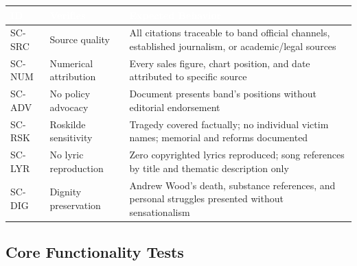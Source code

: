 \documentclass[11pt,letterpaper]{article}
\newcommand{\tableheader}[1]{\textbf{\sffamily\textcolor{white}{#1}}}
\begin{document}
\begin{center}
\begin{tabularx}{\textwidth}{C{1.2cm}L{3.5cm}X}
\toprule
{}
\tableheader{ID} & \tableheader{Verifies} & \tableheader{Expected Behavior} \\
\midrule
SC-SRC & Source quality & All citations traceable to band official channels, established journalism, or academic/legal sources \\
SC-NUM & Numerical attribution & Every sales figure, chart position, and date attributed to specific source \\
SC-ADV & No policy advocacy & Document presents band's positions without editorial endorsement \\
SC-RSK & Roskilde sensitivity & Tragedy covered factually; no individual victim names; memorial and reforms documented \\
SC-LYR & No lyric reproduction & Zero copyrighted lyrics reproduced; song references by title and thematic description only \\
SC-DIG & Dignity preservation & Andrew Wood's death, substance references, and personal struggles presented without sensationalism \\
\bottomrule
\end{tabularx}
\end{center}

\subsection{Core Functionality Tests}
\end{document}
